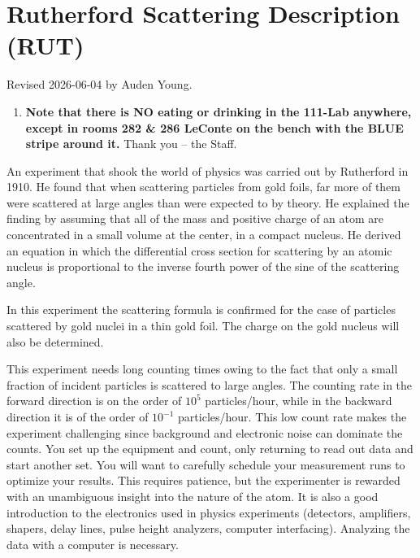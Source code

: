 \documentclass{../lab}
\begin{document}
\maketitle

\tableofcontents

\section{Rutherford Scattering Description (RUT)}

Revised 2026-06-04 by Auden Young.

\begin{enumerate}
    \item \textbf{Note that there is NO eating or drinking in the 111-Lab anywhere, except in rooms 282 \& 286 LeConte on the bench with the BLUE stripe around it.} Thank you -- the Staff.

\end{enumerate}

An experiment that shook the world of physics was carried out by Rutherford in 1910. He found that when scattering \textalpha{} particles from gold foils, far more of them were scattered at large angles than were expected to by theory. He explained the finding by assuming that all of the mass and positive charge of an atom are concentrated in a small volume at the center, in a compact nucleus. He derived an equation in which the differential cross section for scattering by an atomic nucleus is proportional to the inverse fourth power of the sine of the scattering angle.

In this experiment the scattering formula is confirmed for the case of \textalpha{} particles scattered by gold nuclei in a thin gold foil. The charge on the gold nucleus will also be determined.

This experiment needs long counting times owing to the fact that only a small fraction of incident particles is scattered to large angles. The counting rate in the forward direction is on the order of $10^5$ particles/hour, while in the backward direction it is of the order of $10^{-1}$ particles/hour. This low count rate makes the experiment challenging since background and electronic noise can dominate the counts. You set up the equipment and count, only returning to read out data and start another set. You will want to carefully schedule your measurement runs to optimize your results. %
This requires patience, but the experimenter is rewarded with an unambiguous insight into the nature of the atom.
It is also a good introduction to the electronics used in physics experiments (detectors, amplifiers, shapers, delay lines, pulse height analyzers, computer interfacing). Analyzing the data with a computer is necessary.
\end{document}
